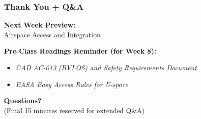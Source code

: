 \documentclass{beamer}
\begin{document}
\begin{frame}[t]
  \frametitle{Thank You + Q\&A}
  
  \begin{center}
      \textbf{Next Week Preview:} \\
      \Large Airspace Access and Integration
  \end{center}
  
  \vspace{0.5cm}
  \textbf{Pre-Class Readings Reminder (for Week 8):}
  \begin{itemize}
      \item \textit{CAD AC-013 (BVLOS) and Safety Requirements Document}
      \item \textit{EASA Easy Access Rules for U-space}
  \end{itemize}
  
  \vspace{0.5cm}
  \begin{center}
      \textbf{Questions?} \\
      \small (Final 15 minutes reserved for extended Q\&A)
  \end{center}
\end{frame}
\end{document}
